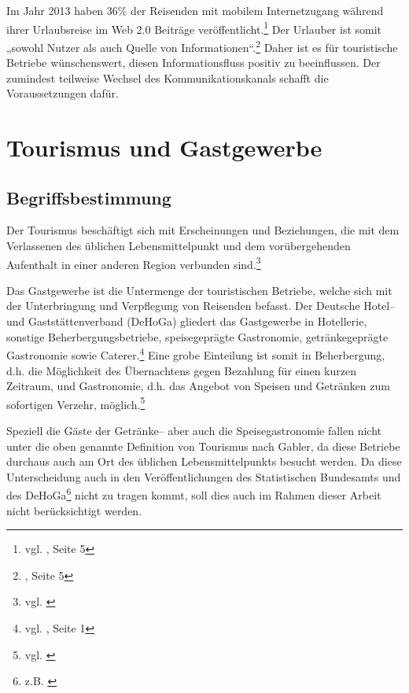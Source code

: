 Im Jahr 2013 haben 36\% der Reisenden mit mobilem Internetzugang während ihrer Urlaubsreise im Web 2.0 Beiträge veröffentlicht.\footnote{vgl. \cite{reiseanalyse}, Seite 5} Der Urlauber ist somit „sowohl Nutzer als auch Quelle von Informationen“.\footnote{\cite{reiseanalyse}, Seite 5} Daher ist es für touristische Betriebe wünschenswert, diesen Informationsfluss positiv zu beeinflussen. Der zumindest teilweise Wechsel des Kommunikationskanals schafft die Voraussetzungen dafür.

\newpage
\section{Tourismus und Gastgewerbe} %
\label{sec:tourismusbranche}

\subsection{Begriffsbestimmung} %
\label{sub:begriffsbestimmung}
Der Tourismus beschäftigt sich mit Erscheinungen und Beziehungen, die mit dem Verlassenen des üblichen Lebensmittelpunkt und dem vorübergehenden Aufenthalt in einer anderen Region verbunden sind.\footnote{vgl. \cite{gabler:tourismus}}

Das Gastgewerbe ist die Untermenge der touristischen Betriebe, welche sich mit der Unterbringung und Verpflegung von Reisenden befasst. Der Deutsche Hotel– und Gaststättenverband (\ac{DeHoGa}) gliedert das Gastgewerbe in Hotellerie, sonstige Beherbergungsbetriebe, speisegeprägte Gastronomie, getränkegeprägte Gastronomie sowie Caterer.\footnote{vgl. \cite{dehoga:zahlenspiegel}, Seite 1} Eine grobe Einteilung ist somit in Beherbergung, d.h. die Möglichkeit des Übernachtens gegen Bezahlung für einen kurzen Zeitraum, und Gastronomie, d.h. das Angebot von Speisen und Getränken zum sofortigen Verzehr, möglich.\footnote{vgl. \cite{destatis:gastgewerbe}}

Speziell die Gäste der Getränke-- aber auch die Speisegastronomie fallen nicht unter die oben genannte Definition von Tourismus nach Gabler, da diese Betriebe durchaus auch am Ort des üblichen Lebensmittelpunkts besucht werden. Da diese Unterscheidung auch in den Veröffentlichungen des Statistischen Bundesamts und des \ac{DeHoGa}\footnote{z.B. \cite{dehoga:zahlenspiegel}} nicht zu tragen kommt, soll dies auch im Rahmen dieser Arbeit nicht berücksichtigt werden.

